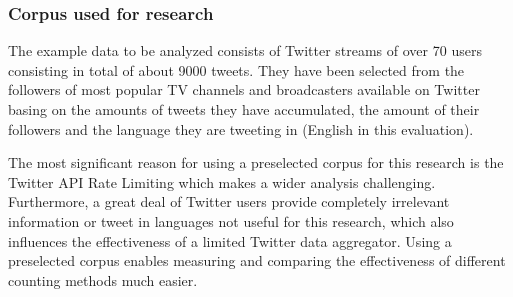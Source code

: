 \subsubsection{Corpus used for research}
The example data to be analyzed consists of Twitter streams of over 70 users
consisting in total of about 9000 tweets. They have been selected from the followers of most popular TV channels and broadcasters available on Twitter basing on the amounts of tweets they have accumulated, the amount of their followers and the language they are tweeting in (English in this evaluation).

The most significant reason for using a preselected corpus for this research is
the Twitter API Rate Limiting which makes a wider analysis challenging.
Furthermore, a great deal of Twitter users provide completely irrelevant
information or tweet in languages not useful for this research, which also
influences the effectiveness of a limited Twitter data aggregator. Using a preselected corpus enables measuring and comparing the effectiveness of different counting methods much easier.
